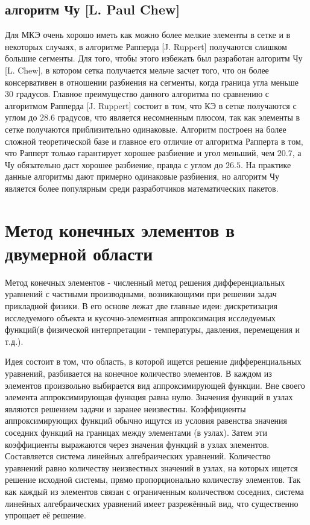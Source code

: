 \documentclass[14pt]{extreport}
\begin{document}
\section{алгоритм Чу [L. Paul Chew]}

Для МКЭ очень хорошо иметь как можно более мелкие элементы в сетке и в некоторых случаях, в алгоритме Рапперда [J. Ruppert] получаются слишком большие сегменты. Для того, чтобы этого избежать был разработан алгоритм Чу [L. Chew], в котором сетка получается мельче засчет того, что он более консервативен в отношении разбиения на сегменты, когда граница угла меньше $30$ градусов. Главное преимущество данного алгоритма по сравнению с алгоритмом Рапперда [J. Ruppert] состоит в том, что КЭ в сетке получаются с углом до $28.6$ градусов, что является несомненным плюсом, так как элементы в сетке получаются приблизительно одинаковые. Алгоритм построен на более сложной теоретической базе \cite{bib:triangle:chew} и главное его отличие от алгоритма Рапперта в том, что Рапперт только гарантирует хорошее разбиение и угол меньший, чем $20.7$, а Чу обязательно даст хорошее разбиение, правда с углом до $26.5$. На практике данные алгоритмы дают примерно одинаковые разбиения, но алгоритм Чу является более популярным среди разработчиков математических пакетов.

\chapter{Метод конечных элементов в двумерной области}

Метод конечных элементов \cite{bib:fem:pankratov, bib:fem:zenkevich} - численный метод решения дифференциальных уравнений с частными производными, возникающими при решении задач прикладной физики.
	В его основе лежат две главные идеи: дискретизация исследуемого объекта и кусочно-элементная аппроксимация исследуемых функций(в физической интерпретации - температуры, давления, перемещения и т.д.).

Идея состоит в том, что область, в которой ищется решение дифференциальных уравнений, разбивается на конечное количество элементов. В каждом из элементов произвольно выбирается вид аппроксимирующей функции. Вне своего элемента аппроксимирующая функция равна нулю. Значения функций в узлах являются решением задачи и заранее неизвестны. Коэффициенты аппроксимирующих функций обычно ищутся из условия равенства значения соседних функций на границах между элементами (в узлах). Затем эти коэффициенты выражаются через значения функций в узлах элементов. Составляется система линейных алгебраических уравнений. Количество уравнений равно количеству неизвестных значений в узлах, на которых ищется решение исходной системы, прямо пропорционально количеству элементов. Так как каждый из элементов связан с ограниченным количеством соседних, система линейных алгебраических уравнений имеет разрежённый вид, что существенно упрощает её решение. 
\end{document}
